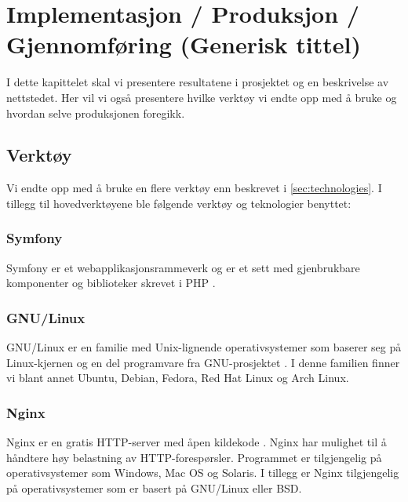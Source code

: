 \cleardoublepage
\chapter{Implementasjon / Produksjon / Gjennomføring (Generisk tittel)}
\label{chap:implementation} 
\clearpage


I dette kapittelet skal vi presentere resultatene i prosjektet og en beskrivelse av nettstedet. Her vil vi også presentere hvilke verktøy vi endte opp med å bruke og hvordan selve produksjonen foregikk.

\section{Verktøy}
Vi endte opp med å bruke en flere verktøy enn beskrevet i  \ref{sec:technologies}. 
I tillegg til hovedverktøyene ble følgende verktøy og teknologier benyttet: 

\subsection{Symfony}
\label{sec:tools-symfony}
Symfony er et webapplikasjonsrammeverk og er et sett med gjenbrukbare komponenter og biblioteker skrevet i PHP \cite{symfony19wis}. 

\subsection{GNU/Linux}
GNU/Linux er en familie med Unix-lignende operativsystemer som baserer seg på Linux-kjernen \cite{kernel_org} og en del programvare fra GNU-prosjektet \cite{gnu_org}. I denne familien finner vi blant annet Ubuntu, Debian, Fedora, Red Hat Linux og Arch Linux.

\subsection{Nginx}
Nginx er en gratis HTTP-server med åpen kildekode \cite{nedelcu2010nginx}. Nginx har mulighet til å håndtere høy belastning av HTTP-forespørsler. Programmet er tilgjengelig på operativsystemer som Windows, Mac OS og Solaris. I tillegg er Nginx tilgjengelig på operativsystemer som er basert på GNU/Linux eller BSD.

